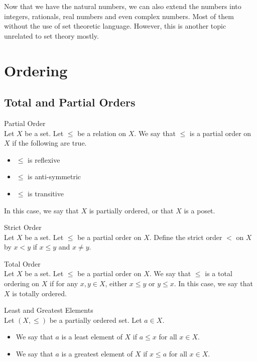 \documentclass[a4paper]{article}
\begin{document}
Now that we have the natural numbers, we can also extend the numbers into integers, rationals, real numbers and even complex numbers. Most of them without the use of set theoretic language. However, this is another topic unrelated to set theory mostly. 

\pagebreak
\section{Ordering}
\subsection{Total and Partial Orders}
\begin{defn}{Partial Order}{}\\
Let $X$ be a set. Let $\leq$ be a relation on $X$. We say that $\leq$ is a partial order on $X$ if the following are true. 
\begin{itemize}
\item $\leq$ is reflexive
\item $\leq$ is anti-symmetric
\item $\leq$ is transitive
\end{itemize}
In this case, we say that $X$ is partially ordered, or that $X$ is a poset. 
\end{defn}

\begin{defn}{Strict Order}{}\\
Let $X$ be a set. Let $\leq$ be a partial order on $X$. Define the strict order $<$ on $X$ by $x<y$ if $x\leq y$ and $x\neq y$. 
\end{defn}

\begin{defn}{Total Order}{}\\
Let $X$ be a set. Let $\leq$ be a partial order on $X$. We say that $\leq$ is a total ordering on $X$ if for any $x,y\in X$, either $x\leq y$ or $y\leq x$. In this case, we say that $X$ is totally ordered. 
\end{defn}
\begin{defn}{Least and Greatest Elements}{}\\
Let $(X,\leq)$ be a partially ordered set. Let $a\in X$. 
\begin{itemize}
\item We say that $a$ is a least element of $X$ if $a\leq x$ for all $x\in X$. 
\item We say that $a$ is a greatest element of $X$ if $x\leq a$ for all $x\in X$. 
\end{itemize}
\end{defn}
\end{document}

